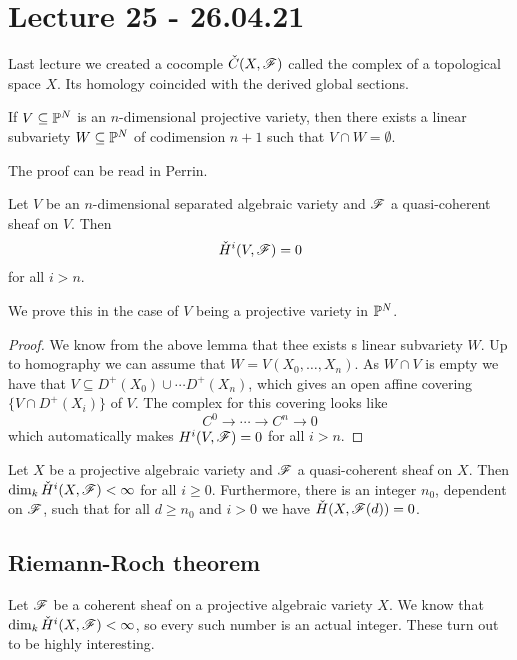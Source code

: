 
\section{Lecture 25 - 26.04.21}

Last lecture we created a cocomple $\cC(X,\F)$ called the \Cech complex of a topological space $X$. Its homology coincided with the derived global sections. 

\begin{lemma}
If $V\subseteq \P^N$ is an $n$-dimensional projective variety, then there exists a linear subvariety $W\subseteq \P^N$ of codimension $n+1$ such that $V\cap W = \emptyset$.
\end{lemma}
The proof can be read in Perrin. 

\begin{theorem}
Let $V$ be an $n$-dimensional separated algebraic variety and $\F$ a quasi-coherent sheaf on $V$. Then 
\begin{equation*}
    \cH^i(V,\F) = 0
\end{equation*}
for all $i>n$. 
\end{theorem}
We prove this in the case of $V$ being a projective variety in $\P^N$.
\begin{proof}
We know from the above lemma that thee exists s linear subvariety $W$. Up to homography we can assume that $W = V(X_0, \ldots, X_n)$. As $W\cap V$ is empty we have that $V\subseteq D^+(X_0)\cup \cdots D^+(X_n)$, which gives an open affine covering $\{ V\cap D^+(X_i)\}$ of $V$. The \Cech complex for this covering looks like
\begin{equation*}
    C^0\longrightarrow \cdots \longrightarrow C^n \longrightarrow 0
\end{equation*}
which automatically makes $H^i(V,\F) = 0$ for all $i>n$. 
\end{proof}

\begin{theorem}
Let $X$ be a projective algebraic variety and $\F$ a quasi-coherent sheaf on $X$. Then $\dim_k \cH^i(X,\F)<\infty$ for all $i\geq 0$. Furthermore, there is an integer $n_0$, dependent on $\F$, such that for all $d\geq n_0$ and $i>0$ we have $\cH(X,\F(d))=0$. 
\end{theorem}

\subsection{Riemann-Roch theorem}

Let $\F$ be a coherent sheaf on a projective algebraic variety $X$. We know that $\dim_k \cH^i(X,\F) < \infty$, so every such number is an actual integer. These turn out to be highly interesting. 

